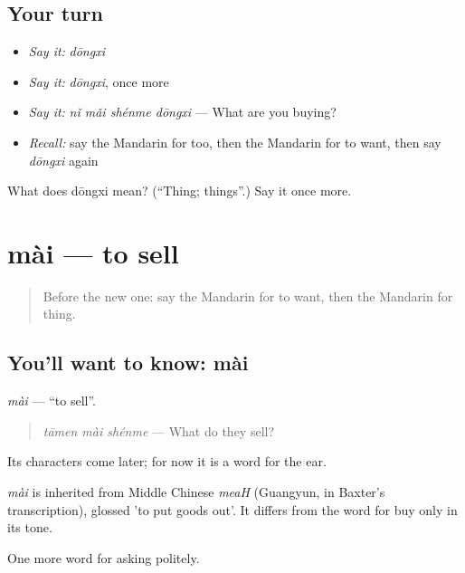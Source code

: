 \subsection*{Your turn}
\begin{itemize}
\raggedright
  \item \emph{Say it:} \emph{dōngxi}
  \item \emph{Say it:} \emph{dōngxi}, once more
  \item \emph{Say it:} \emph{nǐ mǎi shénme dōngxi} — What are you buying?
  \item \emph{Recall:} say the Mandarin for too, then the Mandarin for to want, then say \emph{dōngxi} again
\end{itemize}

\begin{tcolorbox}[breakable,colback=teal!4,colframe=teal!35!black,title={Before you move on}]
What does dōngxi mean? (\textquotedblleft{}Thing; things\textquotedblright{}.) Say it once more.
\end{tcolorbox}
\section[mài]{mài — to sell}

\label{lesson:ZH-C42-mai-sell}



\begin{quote}
Before the new one: say the Mandarin for to want, then the Mandarin for thing.
\end{quote}

\subsection*{You'll want to know: mài}
\emph{mài} — \textquotedblleft{}to sell\textquotedblright{}.

\begin{quote}
\emph{tāmen mài shénme} — What do they sell?
\end{quote}

Its characters come later; for now it is a word for the ear.

\begin{cousinweb}
\emph{mài} is inherited from Middle Chinese \emph{meaH} (Guangyun, in Baxter's transcription), glossed 'to put goods out'. It differs from the word for buy only in its tone.
\end{cousinweb}

\begin{grammarlens}[title={What you've built}]
One more word for asking politely.
\end{grammarlens}

